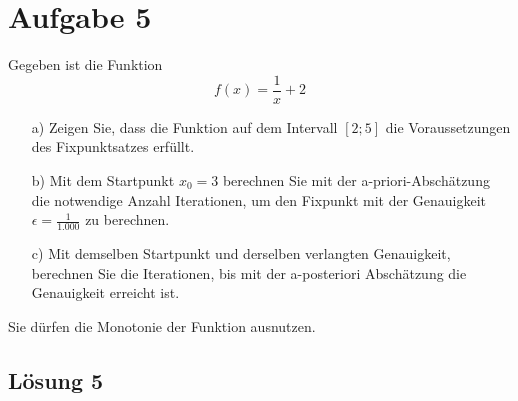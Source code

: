 \documentclass[main.tex]{subfiles}
\begin{document}
\section{Aufgabe 5}
Gegeben ist die Funktion
\begin{equation*}
    f(x) =\frac{1}{x} + 2
\end{equation*}

\begin{enumerate}
    \item[a)] Zeigen Sie, dass die Funktion auf dem Intervall $[2;5]$ die Voraussetzungen des Fixpunktsatzes erfüllt.
    \item[b)] Mit dem Startpunkt $x_{0} = 3$ berechnen Sie mit der a-priori-Abschätzung die notwendige Anzahl Iterationen, um den Fixpunkt mit der Genauigkeit $\epsilon =\frac{1}{1.000}$ zu berechnen.
    \item[c)] Mit demselben Startpunkt und derselben verlangten Genauigkeit, berechnen Sie die Iterationen, bis mit der a-posteriori Abschätzung die Genauigkeit erreicht ist.
\end{enumerate}

Sie dürfen die Monotonie der Funktion ausnutzen.

\subsection{Lösung 5}
\end{document}
